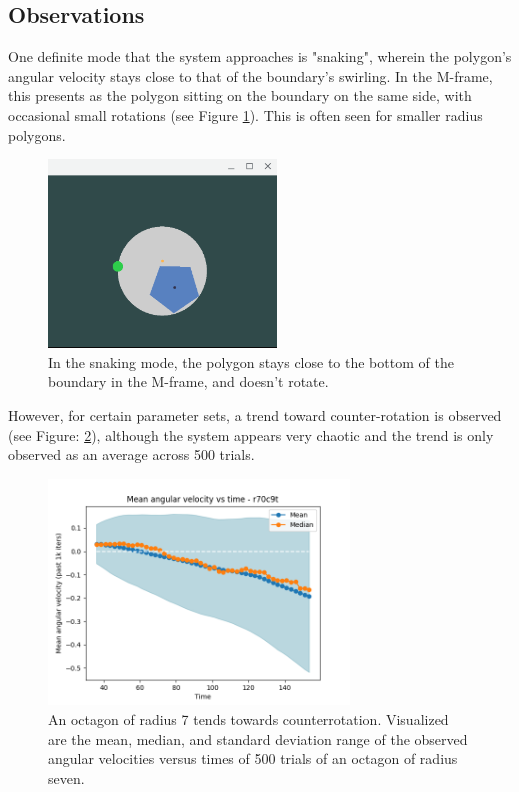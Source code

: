 \documentclass{article}
\begin{document}
\subsection*{Observations}
One definite mode that the system approaches is "snaking", wherein the polygon's angular velocity stays close to that of the boundary's swirling. In the M-frame, this presents as the polygon sitting on the boundary on the same side, with occasional small rotations (see Figure \ref{fig:snaking}). This is often seen for smaller radius polygons. \\
\begin{figure}
    \centering
\includegraphics[height=5cm]{snaking.png}    \caption{In the snaking mode, the polygon stays close to the bottom of the boundary in the M-frame, and doesn't rotate.}
    \label{fig:snaking}
\end{figure}
However, for certain parameter sets, a trend toward counter-rotation is observed (see Figure: \ref{fig:down}), although the system appears very chaotic and the trend is only observed as an average across 500 trials. 
\begin{figure}
    \centering
\includegraphics[height=6cm]{down.png}
   \caption{An octagon of radius 7 tends towards counterrotation. Visualized are the mean, median, and standard deviation range of the observed angular velocities versus times of 500 trials of an octagon of radius seven. }
    \label{fig:down}
\end{figure}
\end{document}
